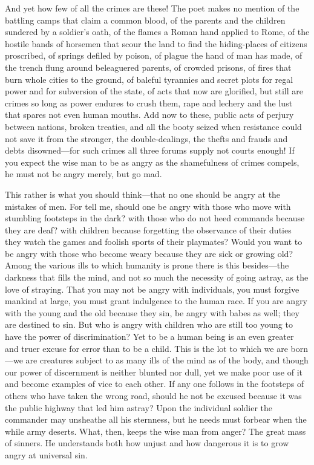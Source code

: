 \noindent And yet how few of all the crimes are these! The poet makes
no mention of the battling camps that claim a common blood, of the
parents and the children sundered by a soldier's oath, of the flames a
Roman hand applied to Rome, of the hostile bands of horsemen that
scour the land to find the hiding-places of citizens proscribed, of
springs defiled by poison, of plague the hand of man has made, of the
trench flung around beleaguered parents, of crowded prisons, of
 fires that burn whole cities to the ground, of baleful
tyrannies and secret plots for regal power and for subversion of the
state, of acts that now are glorified, but still are crimes so long as
power endures to crush them, rape and lechery and the lust that spares
not even human mouths. Add now to these, public acts of perjury
between nations, broken treaties, and all the booty seized when
resistance could not save it from the stronger, the double-dealings,
the thefts and frauds and debts dis\-owned---for such crimes all three
forums supply not courts enough! If you expect the wise man to be as
angry as the shamefulness of crimes compels, he must not be angry
merely, but go mad.

This rather is what you should think---that no one should be angry at
the mistakes of men. For tell me, should one be angry with those who
move with stumbling footsteps in the dark? with those who do not heed
commands because they are deaf? with children because forgetting the
observance of their duties they watch the games and foolish sports of
their playmates? Would you want to be angry with those who become
weary because they are sick or growing old? Among the various ills to
which humanity is prone there is this be\-sides---the darkness that
fills the mind, and not so much the necessity of going astray, as the
love of straying. That you may not be angry with individuals, you must
forgive mankind at large, you must grant indulgence to the human race.
If you are angry with the young and the old because they sin, be angry
with babes as well; they are destined to sin. But who is angry with
children who are still too young to have the power of discrimination?
Yet to be a human being is an even  greater and truer excuse
for error than to be a child. This is the lot to which we are
born---we are creatures subject to as many ills of the mind as of the
body, and though our power of discernment is neither blunted nor dull,
yet we make poor use of it and become examples of vice to each other.
If any one follows in the footsteps of others who have taken the wrong
road, should he not be excused because it was the public highway that
led him astray? Upon the individual soldier the commander may
unsheathe all his sternness, but he needs must forbear when the while
army deserts. What, then, keeps the wise man from anger? The great
mass of sinners. He understands both how unjust and how dangerous it
is to grow angry at universal sin.

